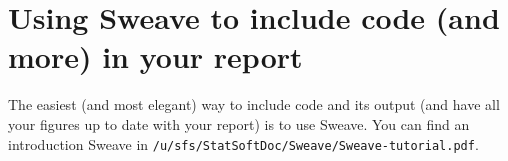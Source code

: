 \section{Using Sweave to include \Rp code (and more) in your report}
The easiest (and most elegant) way to include \Rp code and its output (and
have all your figures up to date with your report) is to use Sweave. You
can find an introduction Sweave in \texttt{/u/sfs/StatSoftDoc/Sweave/Sweave-tutorial.pdf}.

